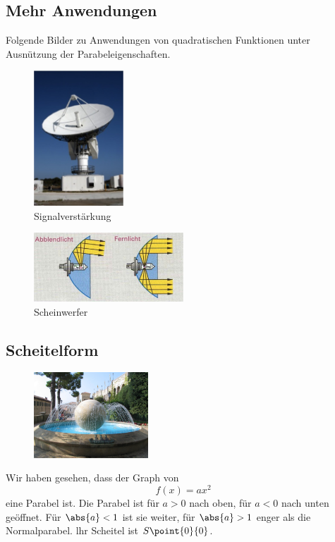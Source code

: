\documentclass[%
11pt,%
twoside,%
titlepage,%
german,%
headsepline%
]{scrartcl}
\begin{document}
\subsection{Mehr Anwendungen}
Folgende Bilder zu Anwendungen von quadratischen Funktionen unter Ausn\"utzung der Parabeleigenschaften.

\begin{figure}
\centering
\includegraphics[width=0.3\textwidth]{pictures/radar}
\caption{Signalverst\"arkung}
\end{figure}

\begin{figure}
\centering
\includegraphics[width=0.5\textwidth]{pictures/scheinwerfer}
\caption{Scheinwerfer}
\end{figure}

\pagebreak

\subsection{Scheitelform}
\begin{figure}
  \begin{center}
    \includegraphics[width=0.382\textwidth]{pictures/springbrunnen}
  \end{center}
\end{figure}
Wir haben gesehen, dass der Graph von
$$f(x)=ax^2$$
eine Parabel ist. Die Parabel ist f\"ur $a>0$ nach oben, f\"ur $a<0$ nach unten ge\"offnet. F\"ur $\abs{a}<1$ ist sie weiter, f\"ur $\abs{a}>1$ enger als die Normalparabel. lhr Scheitel ist $S\point{0}{0}$.
\end{document}
